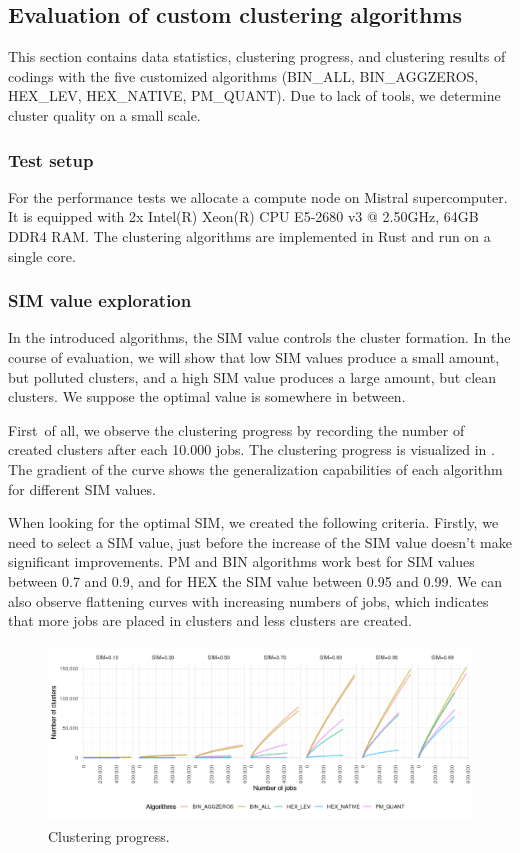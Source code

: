 \documentclass[]{llncs}
\begin{document}
\subsection{Evaluation of custom clustering algorithms}
This section contains data statistics, clustering progress, and clustering results of codings with the five customized algorithms (BIN\_ALL, BIN\_AGGZEROS, HEX\_LEV, HEX\_NATIVE, PM\_QUANT).
Due to lack of tools, we determine cluster quality on a small scale.

\subsubsection{Test setup}
For the performance tests we allocate a compute node on Mistral supercomputer.
It is equipped with 2x Intel(R) Xeon(R) CPU E5-2680 v3 @ 2.50GHz, 64GB DDR4 RAM.
The clustering algorithms are implemented in Rust and run on a single core.

\subsubsection{SIM value exploration}
In the introduced algorithms, the SIM value controls the cluster formation.
In the course of evaluation, we will show that low SIM values produce a small amount, but polluted clusters, and a high SIM value produces a large amount, but clean clusters.
We suppose the optimal value is somewhere in between.

First\ of all, we observe the clustering progress by recording  the number of created clusters after each 10.000 jobs.
The clustering progress is visualized in .
The gradient of the curve shows the generalization capabilities of each algorithm for different SIM values.

When looking for the optimal SIM, we created the following criteria.
Firstly, we need to select a SIM value, just before the increase of the SIM value doesn't make significant improvements.
PM and BIN algorithms work best for SIM values between 0.7 and 0.9, and for HEX the SIM value between 0.95 and 0.99.
We can also observe flattening curves with increasing numbers of jobs, which indicates that more jobs are placed in clusters and less clusters are created.

\begin{figure}
  \centering
   \includegraphics[width=4.61in,height=1.85in]{./media/image15.png}
   \caption{Clustering progress.}
   \label{fig:clustering_progress}
\end{figure}
\end{document}
